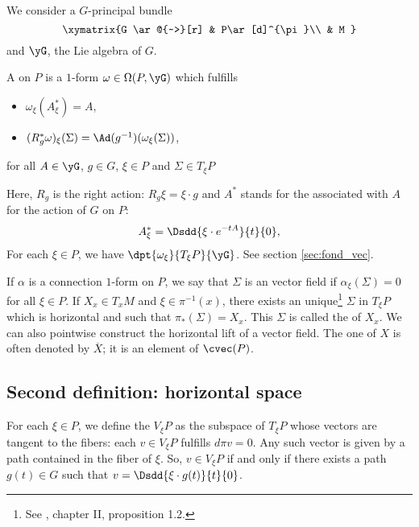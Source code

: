 \label{pg_connpriic}
We consider a $G$-principal bundle 
\[
\xymatrix{%
   G \ar@{~>}[r]		&	P\ar[d]^{\pi}\\
   				&	  M
}
\]
and $\yG$, the Lie algebra of $G$. 

\begin{definition}
A  on $P$  is a $1$-form $\omega\in\Omega(P,\yG)$ which fulfills

\begin{itemize}\label{pg:def:conne}
\item $\omega_{\xi}(A^*_{\xi})=A$,
\item $(R_g^*\omega)_{\xi}(\Sigma)=\Ad(g^{-1})(\omega_{\xi}(\Sigma))$,
\end{itemize}
for all $A\in\yG$, $g\in G$, $\xi\in P$ and $\Sigma\in T_{\xi} P$
\label{defconnform}
\end{definition}
Here, $R_g$ is the right action: $R_g\xi=\xi\cdot g$ and $A^*$ stands for the  associated with $A$ for the action of $G$ on $P$:
\begin{equation} \label{defastar}
   A^*_{\xi}=\Dsdd{ \xi\cdot e^{-tA} }{t}{0},
\end{equation}
For each $\xi\in P$, we have $\dpt{\omega_{\xi}}{T_{\xi} P}{\yG}$. See section \ref{sec:fond_vec}.

If $\alpha$ is a connection $1$-form on $P$, we say that $\Sigma$ is an  vector field if $\alpha_{\xi}(\Sigma)=0$ for all $\xi\in P$. If $X_x\in T_xM$ and $\xi\in\pi^{-1}(x)$, there exists an unique\footnote{See \cite{kobayashi}, chapter II, proposition 1.2.} $\Sigma$ in $T_{\xi} P$ which is horizontal and such that $\pi_*(\Sigma)=X_x$. This $\Sigma$ is called the  of $X_x$. We can also pointwise construct the horizontal lift of a vector field. The one of $X$ is often denoted by $\overline{X}$; it is an element of $\cvec(P)$.

\subsection[Horizontal space]{Second definition: horizontal space}

For each $\xi\in P$, we define the  $V_{\xi} P$ as the subspace of $T_{\xi} P$ whose vectors are tangent to the fibers: each $v\in V_{\xi} P$ fulfills $d\pi v=0$. Any such vector is given by a path contained in the fiber of $\xi$. So, $v\in V_{\xi} P$ if and only if there exists a path $g(t)\in G$ such that $v=\Dsdd{\xi\cdot g(t)}{t}{0}$.


